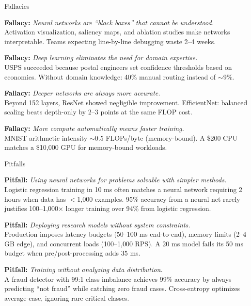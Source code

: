 \documentclass[aspectratio=169, 12pt]{beamer}
\begin{document}
\begin{frame}{Fallacies}

\footnotesize
\textbf{Fallacy:} \textit{Neural networks are ``black boxes'' that cannot be understood.}\\
Activation visualization, saliency maps, and ablation studies make networks interpretable. Teams expecting line-by-line debugging waste 2--4 weeks.

\vspace{0.05cm}
\textbf{Fallacy:} \textit{Deep learning eliminates the need for domain expertise.}\\
USPS succeeded because postal engineers set confidence thresholds based on economics. Without domain knowledge: 40\% manual routing instead of $\sim$9\%.

\vspace{0.05cm}
\textbf{Fallacy:} \textit{Deeper networks are always more accurate.}\\
Beyond 152 layers, ResNet showed negligible improvement. EfficientNet: balanced scaling beats depth-only by 2--3 points at the same FLOP cost.

\vspace{0.05cm}
\textbf{Fallacy:} \textit{More compute automatically means faster training.}\\
MNIST arithmetic intensity $\sim$0.5 FLOPs/byte (memory-bound). A \$200 CPU matches a \$10,000 GPU for memory-bound workloads.

\end{frame}

\begin{frame}{Pitfalls}

\footnotesize
\textbf{Pitfall:} \textit{Using neural networks for problems solvable with simpler methods.}\\
Logistic regression training in 10 ms often matches a neural network requiring 2 hours when data has $<$1,000 examples. 95\% accuracy from a neural net rarely justifies 100--1,000$\times$ longer training over 94\% from logistic regression.

\vspace{0.15cm}
\textbf{Pitfall:} \textit{Deploying research models without system constraints.}\\
Production imposes latency budgets (50--100 ms end-to-end), memory limits (2--4 GB edge), and concurrent loads (100--1,000 RPS). A 20 ms model fails its 50 ms budget when pre/post-processing adds 35 ms.

\vspace{0.15cm}
\textbf{Pitfall:} \textit{Training without analyzing data distribution.}\\
A fraud detector with 99:1 class imbalance achieves 99\% accuracy by always predicting ``not fraud'' while catching zero fraud cases. Cross-entropy optimizes average-case, ignoring rare critical classes.

\end{frame}
\end{document}
